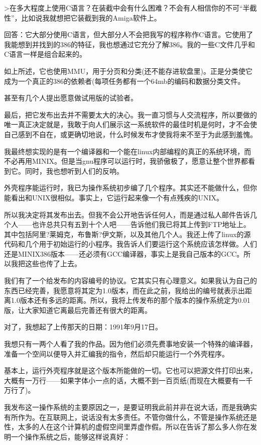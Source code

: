  

>在多大程度上使用C语言？在装截中会有什么困难？不会有人相信你的不可“半截性”，比如说我就想把它装截到我的Amiga软件上。

回答：它大部分使用C语言，但大部分人不会把我写的程序称作C语言。它使用了我能想到并找到的386的特征，我也想通过它充分了解386。我的一些C文件几乎和C语言一样是组合起来的。

 

如上所述，它也使用MMU，用于分页和分类(还不能存进软盘里)。正是分类使它成为一个真正的386的依赖者(每项任务都有一个64mb的编码和数据分类文件。

甚至有几个人提出愿意做试用版的试验者。

最后，把它发布出去并不需要太大的决心。我一直习惯与人交流程序，所以要做的唯一真正决定就是，我敢于向人们展示这一系统软件的最佳时机是何时，才不会使自己感到不自在，或更确切地说，什么时候发布才使我将来不至于为此感到羞愧。

我最终想实现的是有一个编译器和一个能在linux内部编程的真正的系统环境，而不必再用MINIX。但是当gnu程序可以运行时，我骄傲极了，愿意让整个世界都看到它。同时，我也想听到人们的反响。

外壳程序能运行时，我已为操作系统初步编了几个程序。其实还不能做什么，但你能看出和UNIX很相似。事实上，它运行起来像一个有点残疾的UNIX。

所以我决定将其发布出去。但我不会公开地告诉任何人，而是通过私人邮件告诉几个人——也许总共只有五到十个人吧——告诉他们我已将其上传到FTP地址上。其中包括阿里?莱姆克，布鲁斯?伊文斯，以及其他几个人。我还上传了linux的源代码和几个用于初始运行的小程序。我告诉人们要运行这个系统应该怎样做。人们还是MINIX386版本——还必须有GCC编译器，事实上是我自己版本的GCC。所以我把这些也传了上去。

我们有了一个给发布的内容编号的协议。它其实只有心理意义。如果我认为自己的东西已经完善，我愿意将其定为1.0版本，而在此之前，我给出的编号就表示出距离1.0版本还有多远的距离。所以，我将上传发布的那个版本的操作系统定为0.01版，让大家知道它离最后完善还有很大的距离。

对了，我想起了上传那天的日期：1991年9月17日。

我想只有一两个人看了我的作品。因为他们必须先费事地安装一个特殊的编译器，准备一个空间以便导入并汇编我的指令，然后却只能运行一个外壳程序。

基本上，运行外壳程序就是这个版本所能做的一切。它也可以把源文件打印出来，大概有一万行——如果字体小一点的话，大概不到一百页纸(而现在大概要有一千万行了)。

我发布这一操作系统的主要原因之一，是要证明我此前并非在说大话，而是我确实有所作为。在互联网上，说话没有太多责任。不管你做什么，不管是操作系统还是性，太多的人在这个计算机的虚假空间里弄虚作假。所以在告诉了那么多人你在发明一个操作系统之后，能够这样说真好：

